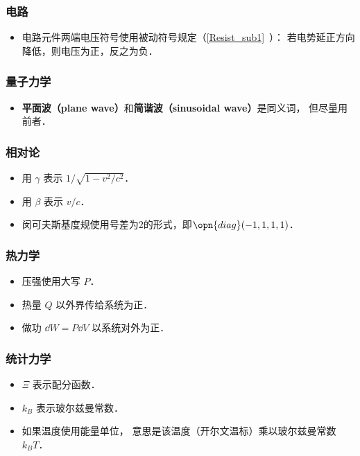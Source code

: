 \subsubsection{电路}
\begin{itemize}
\item 电路元件两端电压符号使用被动符号规定（\autoref{Resist_sub1}~）： 若电势延正方向降低，则电压为正，反之为负．
\end{itemize}

\subsubsection{量子力学}
\begin{itemize}
\item \textbf{平面波（plane wave）}和\textbf{简谐波（sinusoidal wave）}是同义词， 但尽量用前者．
\end{itemize}

\subsubsection{相对论}
\begin{itemize}
\item 用 $\gamma$ 表示 $1/\sqrt{1 - v^2/c^2}$．
\item 用 $\beta$ 表示 $v/c$．
\item 闵可夫斯基度规使用号差为$2$的形式，即$\opn{diag}(-1, 1, 1, 1)$．
\end{itemize}

\subsubsection{热力学}
\begin{itemize}
\item 压强使用大写 $P$．
\item 热量 $Q$ 以外界传给系统为正．
\item 做功 $\dd{W} = P\dd{V}$ 以系统对外为正．
\end{itemize}

\subsubsection{统计力学}
\begin{itemize}
\item $\Xi$ 表示配分函数．
\item $k_B$ 表示玻尔兹曼常数．
\item 如果温度使用能量单位， 意思是该温度（开尔文温标）乘以玻尔兹曼常数 $k_B T$．
\end{itemize}
